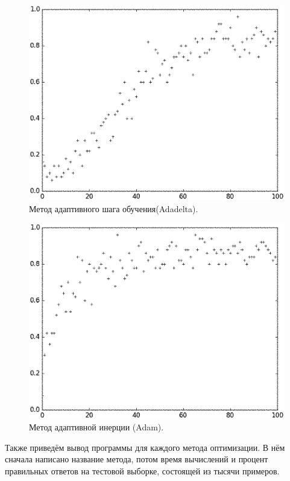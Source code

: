 \documentclass[oneside,final,14pt]{extreport}
\begin{document}
\begin{figure}
    \centering
    \includegraphics[width=1.0\textwidth]{Adadelta.eps}
    \caption{Метод адаптивного шага обучения(Adadelta).}
    \label{fig:Adadelta}
\end{figure}

\begin{figure}
    \centering
    \includegraphics[width=1.0\textwidth]{Adam.eps}
    \caption{Метод адаптивной инерции (Adam).}
    \label{fig:Adam}
\end{figure}
\clearpage


Также приведём вывод программы для каждого метода оптимизации. В нём сначала написано название метода, потом время вычислений и процент правильных ответов на тестовой выборке, состоящей из тысячи примеров.
\end{document}
